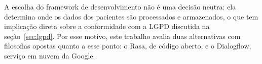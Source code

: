 \documentclass[12pt,a4paper]{extarticle}
\begin{document}
%

A escolha do framework de desenvolvimento não é uma decisão neutra: ela determina onde os dados dos pacientes são processados e armazenados, o que tem implicação direta sobre a conformidade com a LGPD discutida na seção~\ref{sec:lgpd}. Por esse motivo, este trabalho avalia duas alternativas com filosofias opostas quanto a esse ponto: o Rasa, de código aberto, e o Dialogflow, serviço em nuvem da Google.
\end{document}
